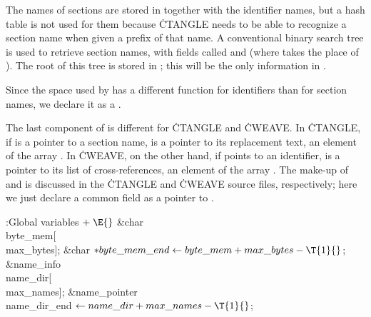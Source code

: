 The names of sections are stored in  together
with the identifier names, but a hash table is not used for them because
\.{CTANGLE} needs to be able to recognize a section name when given a prefix of
that name. A conventional binary search tree is used to retrieve section names,
with fields called  and  (where 
takes the place
of ).  The root of this tree is stored in ;
this will be the only information in .

Since the space used by  has a different function for
identifiers than for section names, we declare it as a .

The last component of  is different for \.{CTANGLE} and
\.{CWEAVE}.  In \.{CTANGLE}, if  is a pointer to a section name,
 is a pointer to its replacement text, an element of the
array .  In \.{CWEAVE}, on the other hand, if
 points to an identifier,  is a pointer to its
list of cross-references, an element of the array .  The make-up
of  and  is discussed in the \.{CTANGLE} and %
\.{CWEAVE}
source files, respectively; here we just declare a common field
 as a pointer to .

\Y\B\4:Global variables\X${}\mathrel+\E{}$\6
\&{char} \\{byte\_mem}[\\{max\_bytes}];\6
\&{char} ${}{*}\\{byte\_mem\_end}\K\\{byte\_mem}+\\{max\_bytes}-\T{1}{}$;\6
\&{name\_info} \\{name\_dir}[\\{max\_names}];\6
\&{name\_pointer} \\{name\_dir\_end}${}\K\\{name\_dir}+\\{max\_names}-\T{1}{}$;%
\par
\fi

